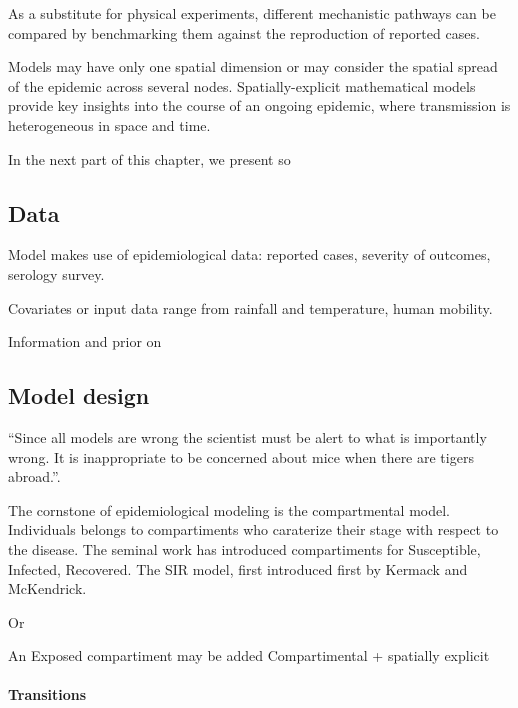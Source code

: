 As a substitute for physical experiments, different mechanistic pathways can be compared by benchmarking them against the reproduction of reported cases. 

Models may have only one spatial dimension or may consider the spatial spread of the epidemic across several nodes. Spatially-explicit mathematical models provide key insights into the course of an ongoing epidemic, where transmission is heterogeneous in space and time.



In the next part of this chapter, we present so

\subsection{Data}
Model makes use of epidemiological data: reported cases, severity of outcomes, serology survey. 

Covariates or input data range from rainfall and temperature, human mobility.

Information and prior on



\subsection{Model design}

“Since all models are wrong the scientist must be alert to what is importantly wrong. It is inappropriate to be concerned about mice when there are tigers abroad.”\cite{Box:ScienceStatistics:1976}.

The cornstone of epidemiological modeling is the compartmental model. Individuals belongs to compartiments who caraterize their stage with respect to the disease. The seminal work has introduced compartiments for Susceptible, Infected, Recovered. The SIR model, first introduced first by Kermack and McKendrick\cite{Kermack:ContributionMathematicalTheory:1927}. 

Or

An Exposed compartiment may be added 
Compartimental + spatially explicit

\paragraph{Transitions}



